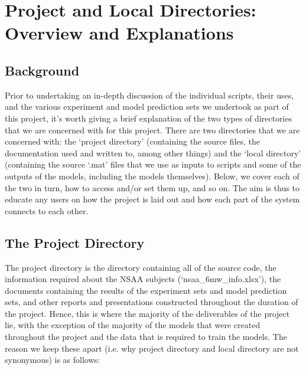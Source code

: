 \documentclass[12pt,twoside]{report}
\begin{document}
\chapter{Project and Local Directories: Overview and Explanations\\}


\section{Background}

\quad Prior to undertaking an in-depth discussion of the individual scripts, their uses, and the various experiment and model prediction sets we undertook as part of this project, it’s worth giving a brief explanation of the two types of directories that we are concerned with for this project. There are two directories that we are concerned with: the ‘project directory’ (containing the source files, the documentation used and written to, among other things) and the ‘local directory’ (containing the source ‘.mat’ files that we use as inputs to scripts and some of the outputs of the models, including the models themselves). Below, we cover each of the two in turn, how to access and/or set them up, and so on. The aim is thus to educate any users on how the project is laid out and how each part of the system connects to each other.


\section{The Project Directory}

\quad The project directory is the directory containing all of the source code, the information required about the NSAA subjects (‘nsaa\_6mw\_info.xlsx’), the documents containing the results of the experiment sets and model prediction sets, and other reports and presentations constructed throughout the duration of the project. Hence, this is where the majority of the deliverables of the project lie, with the exception of the majority of the models that were created throughout the project and the data that is required to train the models. The reason we keep these apart (i.e. why project directory and local directory are not synonymous) is as follows:
\end{document}
